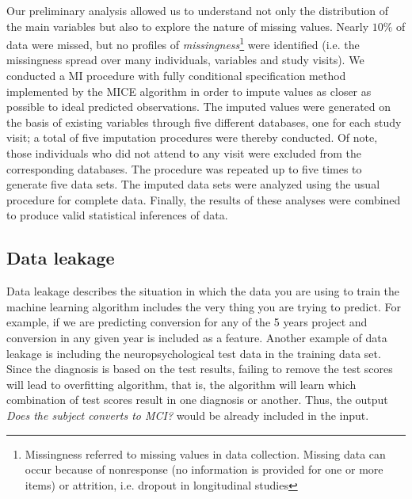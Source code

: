 \documentclass[11pt]{article}
\theoremstyle{definition}
\theoremstyle{remark}
\begin{document}
Our preliminary analysis allowed us to understand not only the distribution of the main variables but also to explore the nature of missing values. Nearly $10\%$ of data were missed, but no profiles of \emph{missingness}\footnote{Missingness referred to missing values in data collection. Missing data can occur because of nonresponse (no information is provided for one or more items) or attrition, i.e. dropout in longitudinal studies} were identified (i.e. the missingness spread over many individuals, variables and study visits). 
We conducted a MI procedure with fully conditional specification method implemented by the MICE algorithm in order to impute values as closer as possible to ideal predicted observations. The imputed values were generated on the basis of existing variables through five different databases, one for each study visit; a total of five imputation procedures were thereby conducted. Of note, those individuals who did not attend to any visit were excluded from the corresponding databases. The procedure was repeated up to five times to generate five data sets. The imputed data sets were analyzed using the usual procedure for complete data. Finally, the results of these analyses were combined to produce valid statistical inferences of data.

\subsection{Data leakage}
\label{sse:dl}
Data leakage describes the situation in which the data you are using to train the machine learning algorithm includes the very thing you are trying to predict. For example, if we are predicting conversion for any of the 5 years project and conversion in any given year is included as a feature.
Another example of data leakage is including the neuropsychological test data in the training data set. Since the diagnosis is based on the test results, failing to remove the test scores will lead to overfitting algorithm, that is, the algorithm will learn which combination of test scores result in one diagnosis or another. Thus, the output \emph{Does the subject converts to MCI?} would be already included in the input.

\end{document}
